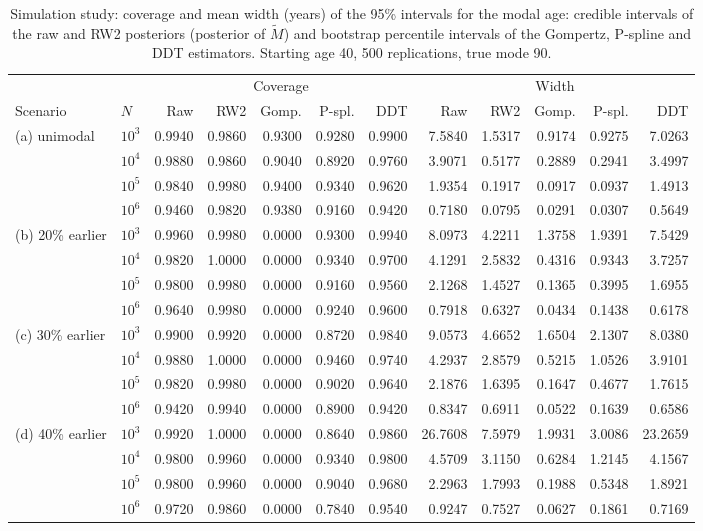 \begin{table}[htb!]
\centering
\caption{Simulation study: coverage and mean width (years) of the 95\% intervals for the modal age: credible intervals of the raw and RW2 posteriors (posterior of $\tilde{M}$) and bootstrap percentile intervals of the Gompertz, P-spline and DDT estimators. Starting age 40, 500 replications, true mode 90.}
\label{tab:app_coverage}
\footnotesize
\setlength{\tabcolsep}{4pt}
\begin{tabular}{ll*{10}{r}}
\hline
 & & \multicolumn{5}{c}{Coverage} & \multicolumn{5}{c}{Width} \\
Scenario & $N$ & Raw & RW2 & Gomp. & P-spl. & DDT & Raw & RW2 & Gomp. & P-spl. & DDT \\
\hline
(a) unimodal & $10^3$ & 0.9940 & 0.9860 & 0.9300 & 0.9280 & 0.9900 & 7.5840 & 1.5317 & 0.9174 & 0.9275 & 7.0263 \\
 & $10^4$ & 0.9880 & 0.9860 & 0.9040 & 0.8920 & 0.9760 & 3.9071 & 0.5177 & 0.2889 & 0.2941 & 3.4997 \\
 & $10^5$ & 0.9840 & 0.9980 & 0.9400 & 0.9340 & 0.9620 & 1.9354 & 0.1917 & 0.0917 & 0.0937 & 1.4913 \\
 & $10^6$ & 0.9460 & 0.9820 & 0.9380 & 0.9160 & 0.9420 & 0.7180 & 0.0795 & 0.0291 & 0.0307 & 0.5649 \\[2pt]
(b) 20\% earlier & $10^3$ & 0.9960 & 0.9980 & 0.0000 & 0.9300 & 0.9940 & 8.0973 & 4.2211 & 1.3758 & 1.9391 & 7.5429 \\
 & $10^4$ & 0.9820 & 1.0000 & 0.0000 & 0.9340 & 0.9700 & 4.1291 & 2.5832 & 0.4316 & 0.9343 & 3.7257 \\
 & $10^5$ & 0.9800 & 0.9980 & 0.0000 & 0.9160 & 0.9560 & 2.1268 & 1.4527 & 0.1365 & 0.3995 & 1.6955 \\
 & $10^6$ & 0.9640 & 0.9980 & 0.0000 & 0.9240 & 0.9600 & 0.7918 & 0.6327 & 0.0434 & 0.1438 & 0.6178 \\[2pt]
(c) 30\% earlier & $10^3$ & 0.9900 & 0.9920 & 0.0000 & 0.8720 & 0.9840 & 9.0573 & 4.6652 & 1.6504 & 2.1307 & 8.0380 \\
 & $10^4$ & 0.9880 & 1.0000 & 0.0000 & 0.9460 & 0.9740 & 4.2937 & 2.8579 & 0.5215 & 1.0526 & 3.9101 \\
 & $10^5$ & 0.9820 & 0.9980 & 0.0000 & 0.9020 & 0.9640 & 2.1876 & 1.6395 & 0.1647 & 0.4677 & 1.7615 \\
 & $10^6$ & 0.9420 & 0.9940 & 0.0000 & 0.8900 & 0.9420 & 0.8347 & 0.6911 & 0.0522 & 0.1639 & 0.6586 \\[2pt]
(d) 40\% earlier & $10^3$ & 0.9920 & 1.0000 & 0.0000 & 0.8640 & 0.9860 & 26.7608 & 7.5979 & 1.9931 & 3.0086 & 23.2659 \\
 & $10^4$ & 0.9800 & 0.9960 & 0.0000 & 0.9340 & 0.9800 & 4.5709 & 3.1150 & 0.6284 & 1.2145 & 4.1567 \\
 & $10^5$ & 0.9800 & 0.9960 & 0.0000 & 0.9040 & 0.9680 & 2.2963 & 1.7993 & 0.1988 & 0.5348 & 1.8921 \\
 & $10^6$ & 0.9720 & 0.9860 & 0.0000 & 0.7840 & 0.9540 & 0.9247 & 0.7527 & 0.0627 & 0.1861 & 0.7169 \\
\hline
\end{tabular}
\end{table}
